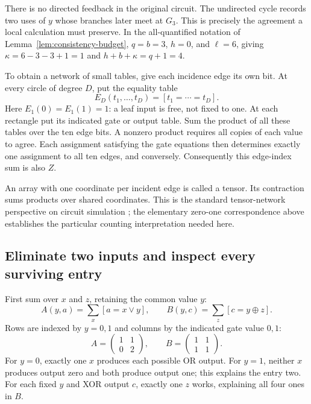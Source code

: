 There is no directed feedback in the original circuit. The undirected cycle
records two uses of $y$ whose branches later meet at $G_3$. This is precisely
the agreement a local calculation must preserve. In the all-quantified
notation of Lemma~\ref{lem:consistency-budget}, $q=b=3$, $h=0$, and
$\ell=6$, giving $\kappa=6-3-3+1=1$ and $h+b+\kappa=q+1=4$.

To obtain a network of small tables, give each incidence edge its own bit.
At every circle of degree $D$, put the equality table
\[
 E_D(t_1,\ldots,t_D)=[t_1=\cdots=t_D].
\]
Here $E_1(0)=E_1(1)=1$: a leaf input is free, not fixed to one.
At each rectangle put its indicated gate or output table. Sum the product
of all these tables over the ten edge bits. A nonzero product requires all
copies of each value to agree. Each assignment satisfying the gate equations
then determines exactly one assignment to all ten edges, and conversely.
Consequently this edge-index sum is also $Z$.

An array with one coordinate per incident edge is called a tensor. Its
contraction sums products over shared coordinates. This is the standard
tensor-network perspective on circuit simulation \citep{MarkovShi2008};
the elementary zero-one correspondence above establishes the particular
counting interpretation needed here.

\subsection{Eliminate two inputs and inspect every surviving entry}

First sum over $x$ and $z$, retaining the common value $y$:
\[
 A(y,a)=\sum_x [a=x\lor y],\qquad
 B(y,c)=\sum_z [c=y\oplus z].
\]
Rows are indexed by $y=0,1$ and columns by the indicated gate value $0,1$:
\begin{equation}\label{eq:walk-matrices}
 A=\begin{pmatrix}1&1\\0&2\end{pmatrix},\qquad
 B=\begin{pmatrix}1&1\\1&1\end{pmatrix}.
\end{equation}
For $y=0$, exactly one $x$ produces each possible OR output. For $y=1$,
neither $x$ produces output zero and both produce output one; this explains
the entry two. For each fixed $y$ and XOR output $c$, exactly one $z$
works, explaining all four ones in $B$.


